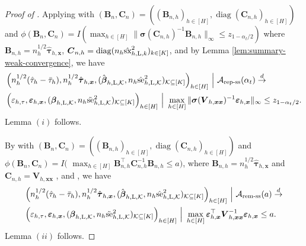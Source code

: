 \documentclass[12pt]{article}
\newcommand{\se}{\textnormal{se}}
\newcommand{\Lin}{\textnormal{L}}
\newcommand{\diag}{\operatorname{diag}}
\newcommand{\wconv}{\stackrel{d}{\rightarrow}}
\newcommand{\mk}{\mathcal{K}}
\newcommand{\ma}{\mathcal{A}}
\newcommand{\remss}{\textnormal{rem-ss}}
\newcommand{\repss}{\textnormal{rep-ss}}
\newcommand{\bs}{\boldsymbol}
\newcommand{\sx}{\textnormal{sx}}
\begin{document}
\begin{proof}[Proof of ]
 Applying  with $(\bs{B}_n,\bs{C}_n) = ((\bs{B}_{n,h})_{h\in [H]},\diag(\bs{C}_{n, h})_{h\in [H]} )$ and $\phi(\bs{B}_n,\bs{C}_n) = I(\max_{h\in [H]} \|\bs{\sigma}(\bs{C}_{n,h})^{-1}\bs{B}_{n,h}\|_{\infty}\leq z_{1-\alpha_t/2})$ where $\bs{B}_{n,h} =  n_h^{1/2}\hat{\bs{\tau}}_{h,\bs{x}}$, $ \bs{C}_{n, h} = \diag(n_h\hat{\sx}^2_{h,\Lin,k})_{k\in [K]} $, and by Lemma \ref{lem:summary-weak-convergence},  we have
     \begin{align*}
        & \Big(n_h^{1/2}(\hat{\tau}_{h}-\bar{\tau}_h), n_h^{1/2}\hat{\bs{\tau}}_{h,\bs{x}},(\hat{\bs{\beta}}_{h,\Lin,\mk}, n_h \hat{\se}_{h,\Lin,\mk}^2)_{\mk\subseteq [K]}\Big)_{h\in [H]} ~\Big|~ \ma_{\repss}(\alpha_t) \wconv \\
        &
      \Big(\varepsilon_{h,\tau}, \bs{\varepsilon}_{h,\bs{x}}, (\bs{\beta}_{h,\Lin,\mk}, n_h \tilde{\se}_{h,\Lin,\mk}^2)_{\mk\subseteq [K]}\Big)_{h\in [H]} ~\Big | ~ \max_{h\in [H]}\|\bs{\sigma}(\bs{V}_{h,\bs{x}\bs{x}})^{-1}\bs{\varepsilon}_{h,\bs{x}}\|_{\infty} \leq z_{1-\alpha_t/2}.
    \end{align*}
Lemma $(i)$ follows.

By  with $(\bs{B}_n,\bs{C}_n) = ((\bs{B}_{n,h})_{h\in [H]}, \diag(\bs{C}_{n,h})_{h\in [H]})$ and $\phi(\bs{B}_n, \bs{C}_n) = I($ $\max_{h\in [H]} \bs{B}_{n,h}^\top \bs{C}_{n,h}^{-1} \bs{B}_{n,h} \leq a)$, where $\bs{B}_{n,h} = n_h^{1/2}\hat{\bs{\tau}}_{h,\bs{x}}$ and $\bs{C}_{n,h} = \bs{V}_{h,\bs{x}\bs{x}}$ , and , we have 
    \begin{align*}
        & \Big(n_h^{1/2}(\hat{\tau}_{h}-\bar{\tau}_h), n_h^{1/2}\hat{\bs{\tau}}_{h,\bs{x}},(\hat{\bs{\beta}}_{h,\Lin,\mk}, n_h \hat{\se}_{h,\Lin,\mk}^2)_{\mk\subseteq [K]}\Big)_{h\in [H]} ~\Big|~ \ma_{\remss}(a) \wconv \\
        &
      \Big(\varepsilon_{h,\tau}, \bs{\varepsilon}_{h,\bs{x}}, (\bs{\beta}_{h,\Lin,\mk}, n_h \tilde{\se}_{h,\Lin,\mk}^2)_{\mk\subseteq [K]}\Big)_{h\in [H]} ~\Big|~ \max_{h\in [H]}\bs{\varepsilon}_{h,\bs{x}}^\top \bs{V}_{h,\bs{x}\bs{x}}^{-1} \bs{\varepsilon}_{h,\bs{x}} \leq a.
    \end{align*}
Lemma $(ii)$ follows.


\end{proof}
\end{document}
